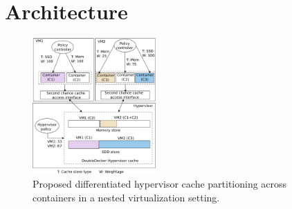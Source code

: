 \section{\dd{} Architecture}
\label{sec:design}

\begin{figure}[t]
  \centering
\includegraphics[width=0.42\textwidth]{images/arch} 
 \caption{Proposed differentiated hypervisor cache partitioning 
          across containers in a nested virtualization setting.
         }
 \label{fig:desired} 
\vspace{-0.3cm}
\end{figure}

